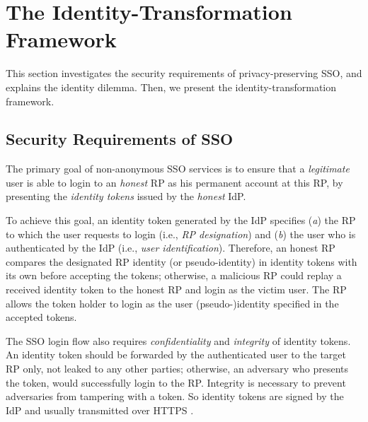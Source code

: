 \section{The Identity-Transformation Framework}
\label{sec:challenge}

This section investigates the security requirements of privacy-preserving SSO,
    and explains the identity dilemma.
Then,
    we present the identity-transformation framework.


\subsection{Security Requirements of SSO}
\label{subsec:basicrequirements}

The primary goal of non-anonymous SSO services is %
 to ensure that a \emph{legitimate} user is able to login to an \emph{honest} RP as his permanent account at this RP, %
    by presenting the \emph{identity tokens} issued by the \emph{honest} IdP.

To achieve this goal,
 an identity token generated by the IdP \cite{OpenIDConnect,rfc6749,SAML,SAMLIdentifier,NIST2017draft,BrowserID,SPRESSO} specifies (\emph{a}) the RP to which the user requests to login (i.e., \emph{RP designation})
    and  (\emph{b}) the user who is authenticated by the IdP (i.e., \emph{user identification}).
Therefore,
    an honest RP compares the designated RP identity (or pseudo-identity) in identity tokens with its own before accepting the tokens;
     otherwise,
        a malicious RP could replay a received identity token to the honest RP and login as the victim user.
The RP allows the token holder to login as the user (pseudo-)identity specified in the accepted tokens.

The SSO login flow also requires \emph{confidentiality} and \emph{integrity} of identity tokens.
An identity token should be forwarded by the authenticated user to the target RP only,
    not leaked to any other parties;
        otherwise, an adversary who presents the token, would successfully login to the RP.
Integrity is necessary
    to prevent adversaries from tampering with a token.
So identity tokens are signed by the IdP and usually transmitted over HTTPS \cite{OpenIDConnect,rfc6749,SAML}.


